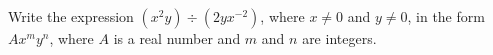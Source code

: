 Write the expression $\left(x^2y\right)\div\left(2yx^{-2}\right)$, where $x\ne0$ and $y\ne0$, in the form $Ax^my^n$, where $A$ is a real number and $m$ and $n$ are integers.
